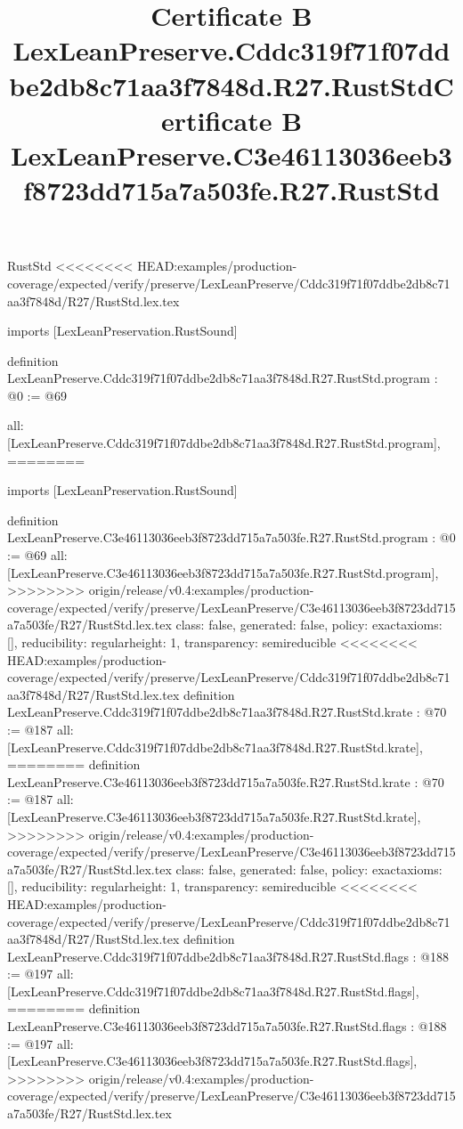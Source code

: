 \begin{lexlean}{RustStd}
<<<<<<<< HEAD:examples/production-coverage/expected/verify/preserve/LexLeanPreserve/Cddc319f71f07ddbe2db8c71aa3f7848d/R27/RustStd.lex.tex
\title{Certificate B LexLeanPreserve.Cddc319f71f07ddbe2db8c71aa3f7848d.R27.RustStd}
\begin{coremodule}
imports [LexLeanPreservation.RustSound]

definition LexLeanPreserve.Cddc319f71f07ddbe2db8c71aa3f7848d.R27.RustStd.program : @0 := @69 {
  all: [LexLeanPreserve.Cddc319f71f07ddbe2db8c71aa3f7848d.R27.RustStd.program],
========
\title{Certificate B LexLeanPreserve.C3e46113036eeb3f8723dd715a7a503fe.R27.RustStd}
\begin{coremodule}
imports [LexLeanPreservation.RustSound]

definition LexLeanPreserve.C3e46113036eeb3f8723dd715a7a503fe.R27.RustStd.program : @0 := @69 {
  all: [LexLeanPreserve.C3e46113036eeb3f8723dd715a7a503fe.R27.RustStd.program],
>>>>>>>> origin/release/v0.4:examples/production-coverage/expected/verify/preserve/LexLeanPreserve/C3e46113036eeb3f8723dd715a7a503fe/R27/RustStd.lex.tex
  class: false,
  generated: false,
  policy: exact{axioms: []},
  reducibility: regular{height: 1},
  transparency: semireducible
}
<<<<<<<< HEAD:examples/production-coverage/expected/verify/preserve/LexLeanPreserve/Cddc319f71f07ddbe2db8c71aa3f7848d/R27/RustStd.lex.tex
definition LexLeanPreserve.Cddc319f71f07ddbe2db8c71aa3f7848d.R27.RustStd.krate : @70 := @187 {
  all: [LexLeanPreserve.Cddc319f71f07ddbe2db8c71aa3f7848d.R27.RustStd.krate],
========
definition LexLeanPreserve.C3e46113036eeb3f8723dd715a7a503fe.R27.RustStd.krate : @70 := @187 {
  all: [LexLeanPreserve.C3e46113036eeb3f8723dd715a7a503fe.R27.RustStd.krate],
>>>>>>>> origin/release/v0.4:examples/production-coverage/expected/verify/preserve/LexLeanPreserve/C3e46113036eeb3f8723dd715a7a503fe/R27/RustStd.lex.tex
  class: false,
  generated: false,
  policy: exact{axioms: []},
  reducibility: regular{height: 1},
  transparency: semireducible
}
<<<<<<<< HEAD:examples/production-coverage/expected/verify/preserve/LexLeanPreserve/Cddc319f71f07ddbe2db8c71aa3f7848d/R27/RustStd.lex.tex
definition LexLeanPreserve.Cddc319f71f07ddbe2db8c71aa3f7848d.R27.RustStd.flags : @188 := @197 {
  all: [LexLeanPreserve.Cddc319f71f07ddbe2db8c71aa3f7848d.R27.RustStd.flags],
========
definition LexLeanPreserve.C3e46113036eeb3f8723dd715a7a503fe.R27.RustStd.flags : @188 := @197 {
  all: [LexLeanPreserve.C3e46113036eeb3f8723dd715a7a503fe.R27.RustStd.flags],
>>>>>>>> origin/release/v0.4:examples/production-coverage/expected/verify/preserve/LexLeanPreserve/C3e46113036eeb3f8723dd715a7a503fe/R27/RustStd.lex.tex
}}}
\end{coremodule}}
\end{coremodule}
\end{lexlean}
